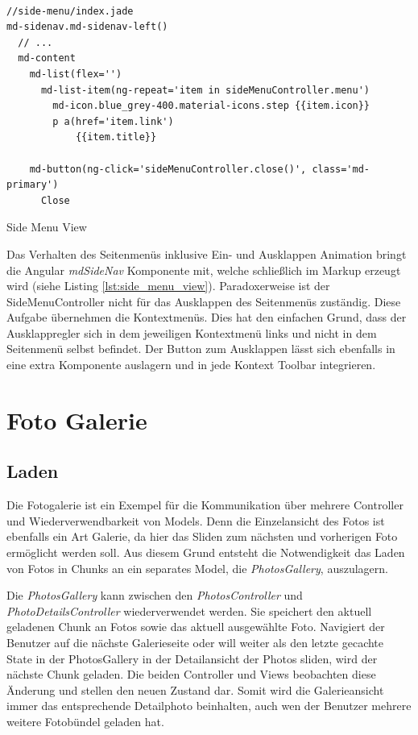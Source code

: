 \begin{listing}[H]
\begin{verbatim}

//side-menu/index.jade
md-sidenav.md-sidenav-left()
  // ...
  md-content
    md-list(flex='')
      md-list-item(ng-repeat='item in sideMenuController.menu')
        md-icon.blue_grey-400.material-icons.step {{item.icon}}
        p a(href='item.link')
            {{item.title}}

    md-button(ng-click='sideMenuController.close()', class='md-primary')
      Close

\end{verbatim}
\caption{Side Menu View}
\label{lst:side_menu_view}
\end{listing}

Das Verhalten des Seitenmenüs inklusive Ein- und Ausklappen Animation bringt die Angular \textit{mdSideNav} Komponente mit, welche schließlich im Markup erzeugt wird (siehe Listing \ref{lst:side_menu_view}). Paradoxerweise ist der SideMenuController nicht für das Ausklappen des Seitenmenüs zuständig. Diese Aufgabe übernehmen die Kontextmenüs. Dies hat den einfachen Grund, dass der Ausklappregler sich in dem jeweiligen Kontextmenü links und nicht in dem Seitenmenü selbst befindet. Der Button zum Ausklappen lässt sich ebenfalls in eine extra Komponente auslagern und in jede Kontext Toolbar integrieren.

\section{Foto Galerie}
\label{sec:photo_gallery}

\subsection{Laden}

Die Fotogalerie ist ein Exempel für die Kommunikation über mehrere Controller und Wiederverwendbarkeit von Models. Denn die Einzelansicht des Fotos ist ebenfalls ein Art Galerie, da hier das Sliden zum nächsten und vorherigen Foto ermöglicht werden soll. Aus diesem Grund entsteht die Notwendigkeit das Laden von Fotos in Chunks an ein separates Model, die \textit{PhotosGallery}, auszulagern.

Die \textit{PhotosGallery} kann zwischen den \textit{PhotosController} und \textit{PhotoDetailsController} wiederverwendet werden. Sie speichert den aktuell geladenen Chunk an Fotos sowie das aktuell ausgewählte Foto. Navigiert der Benutzer auf die nächste Galerieseite oder will weiter als den letzte gecachte State in der PhotosGallery in der Detailansicht der Photos sliden, wird der nächste Chunk geladen. Die beiden Controller und Views beobachten diese Änderung und stellen den neuen Zustand dar. Somit wird die Galerieansicht immer das entsprechende Detailphoto beinhalten, auch wen der Benutzer mehrere weitere Fotobündel geladen hat.

